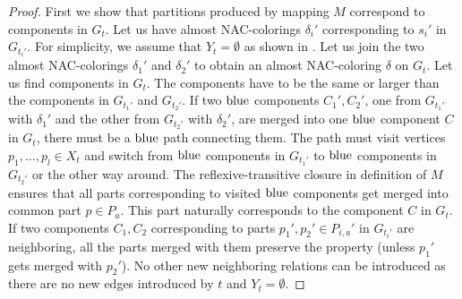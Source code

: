 \begin{proof}
	First we show that partitions produced by mapping \( M \)
	correspond to components in \( G_t \).
	Let us have almost NAC-colorings \( \delta_i' \) corresponding
	to \( s_i' \) in \( G_{t_i'} \).
	For simplicity, we assume that \( Y_t = \emptyset \)
	as shown in .
	Let us join the two almost NAC-colorings \( \delta_1' \) and \( \delta_2' \)
	to obtain an almost NAC-coloring \( \delta \) on \( G_t \).
	Let us find components in \( G_t \).
	The components have to be the same or larger
	than the components in \( G_{t_1'} \) and \( G_{t_2'} \).
	If two \( \text{blue} \) components \( C_1', C_2' \),
	one from \( G_{t_1'} \) with \( \delta_1' \) and
	the other from \( G_{t_2'} \) with \( \delta_2' \),
	are merged into one \( \text{blue} \) component \( C \) in \( G_t \),
	there must be a \( \text{blue} \) path connecting them.
	The path must visit vertices \( p_1, \dots, p_l \in X_t \)
	and switch from \( \text{blue} \) components in \( G_{t_1'} \)
	to \( \text{blue} \) components in \( G_{t_2'} \) or the other way around.
	The reflexive-transitive closure in definition of \( M \) ensures that
	all parts corresponding to visited \( \text{blue} \) components
	get merged into common part \( p \in P_a \).
	This part naturally corresponds to the component \( C \) in \( G_t \).
	If two components \( C_1, C_2 \) corresponding to
	parts \( p_1', p_2' \in P_{i,a}' \) in \( G_{t_i'} \) are neighboring,
	all the parts merged with them preserve the property
	(unless \( p_1' \) gets merged with \( p_2' \)).
	No other new neighboring relations can be introduced
	as there are no new edges introduced by \( t \) and \( Y_t = \emptyset \).


\end{proof}
